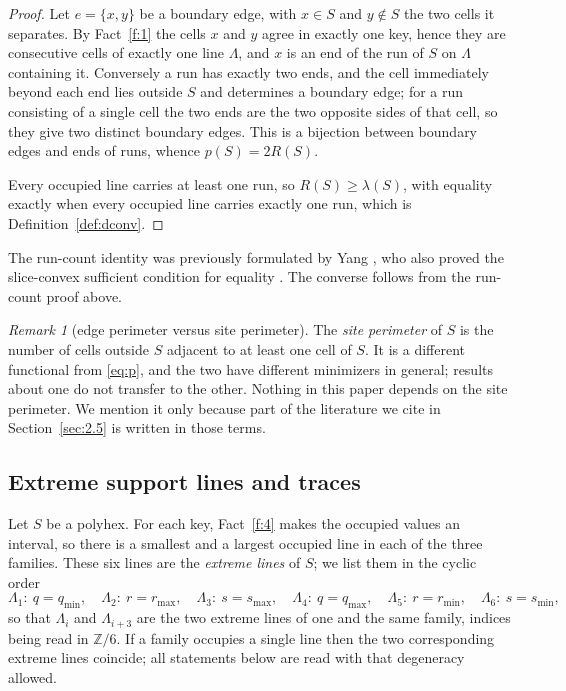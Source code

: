 \documentclass[11pt]{article}
\theoremstyle{plain}
\theoremstyle{definition}
\theoremstyle{remark}
\newtheorem{remark}[theorem]{Remark}
\newcommand{\Z}{\mathbb{Z}}
\begin{document}
\begin{proof}
Let \(e=\{x,y\}\) be a boundary edge, with \(x\in S\) and \(y\notin S\) the two cells it
separates. By Fact~\ref{f:1} the cells \(x\) and \(y\) agree in exactly one key, hence
they are consecutive cells of exactly one line \(\Lambda\), and \(x\) is an end of the run
of \(S\) on \(\Lambda\) containing it. Conversely a run has exactly two ends, and the cell
immediately beyond each end lies outside \(S\) and determines a boundary edge; for a run
consisting of a single cell the two ends are the two opposite sides of that cell, so they
give two distinct boundary edges. This is a bijection between boundary edges and ends of
runs, whence \(p(S)=2R(S)\).

Every occupied line carries at least one run, so \(R(S)\ge\lambda(S)\), with equality
exactly when every occupied line carries exactly one run, which is
Definition~\ref{def:dconv}.
\end{proof}
\noindent The run-count identity was previously formulated by Yang \cite[Theorem~4]{Yang2002},
who also proved the slice-convex sufficient condition for equality
\cite[Theorem~5]{Yang2002}. The converse follows from the run-count proof above.


\begin{remark}[edge perimeter versus site perimeter]\label{rem:site}
The \emph{site perimeter} of \(S\) is the number of cells outside \(S\) adjacent to at
least one cell of \(S\). It is a different functional from \eqref{eq:p}, and the two have
different minimizers in general; results about one do not transfer to the other. Nothing
in this paper depends on the site perimeter. We mention it only because part of the
literature we cite in Section~\ref{sec:2.5} is written in those terms.
\end{remark}

\subsection{Extreme support lines and traces}\label{sec:2.3}

Let \(S\) be a polyhex. For each key, Fact~\ref{f:4} makes the occupied values an interval,
so there is a smallest and a largest occupied line in each of the three families. These six
lines are the \emph{extreme lines} of \(S\); we list them in the cyclic order
\[
   \Lambda_{1}:\ q=q_{\min},\quad
   \Lambda_{2}:\ r=r_{\max},\quad
   \Lambda_{3}:\ s=s_{\max},\quad
   \Lambda_{4}:\ q=q_{\max},\quad
   \Lambda_{5}:\ r=r_{\min},\quad
   \Lambda_{6}:\ s=s_{\min},
\]
so that \(\Lambda_{i}\) and \(\Lambda_{i+3}\) are the two extreme lines of one and the same
family, indices being read in \(\Z/6\). If a family occupies a single line then the two
corresponding extreme lines coincide; all statements below are read with that degeneracy
allowed.
\end{document}
